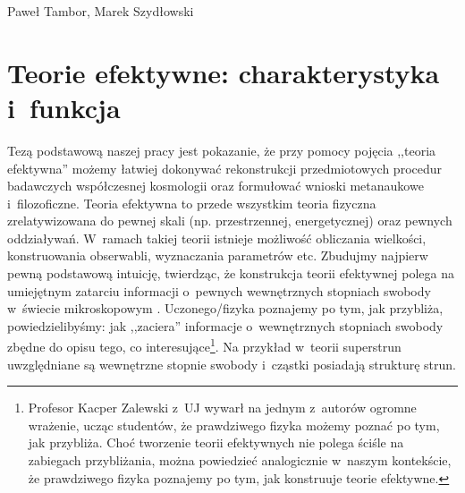 \begin{artplenv2auth}{Paweł Tambor, Marek Szydłowski}
\section{Teorie efektywne: charakterystyka i~funkcja}
Tezą podstawową naszej pracy jest pokazanie, że przy pomocy pojęcia ,,teoria efektywna'' możemy łatwiej dokonywać rekonstrukcji przedmiotowych procedur badawczych współczesnej kosmologii oraz formułować wnioski metanaukowe i~filozoficzne. Teoria efektywna to przede wszystkim teoria fizyczna zrelatywizowana do pewnej skali (np. przestrzennej, energetycznej) oraz pewnych oddziaływań. W~ramach takiej teorii istnieje możliwość obliczania wielkości, konstruowania obserwabli, wyznaczania parametrów etc. Zbudujmy najpierw pewną podstawową intuicję, twierdząc, że konstrukcja teorii efektywnej polega na umiejętnym zatarciu informacji o~pewnych wewnętrznych stopniach swobody w~świecie mikroskopowym 
\parencites{morrison_modelling_1998}{morrison_approximating_2005}.
Uczonego/fizyka poznajemy po tym, jak przybliża, powiedzielibyśmy: jak ,,zaciera'' informacje o~wewnętrznych stopniach swobody zbędne do opisu tego, co interesujące\footnote{Profesor Kacper Zalewski z~UJ wywarł na jednym z~autorów ogromne wrażenie, ucząc studentów, że prawdziwego fizyka możemy poznać po tym, jak przybliża. Choć tworzenie teorii efektywnych nie polega ściśle na zabiegach przybliżania, można powiedzieć analogicznie w~naszym kontekście, że prawdziwego fizyka poznajemy po tym, jak konstruuje teorie efektywne.}. Na przykład w~teorii superstrun uwzględniane są wewnętrzne stopnie swobody i~cząstki posiadają strukturę strun.


\end{artplenv2auth}
